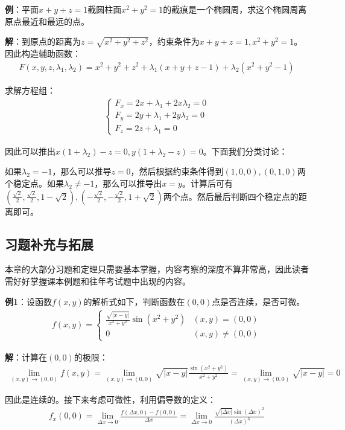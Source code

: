 \documentclass{ctexart}
\let\oldtextbf\textbf %
\renewcommand{\textbf}[1]{\textcolor{btex}{\oldtextbf{#1}}} %
\begin{document}
\textbf{例}：平面$x+y+z=1$截圆柱面$x^2+y^2=1$的截痕是一个椭圆周，求这个椭圆周离原点最近和最远的点。

\textbf{解}：到原点的距离为$z=\sqrt{x^2+y^2+z^2}$，约束条件为$x+y+z=1,x^2+y^2=1$。因此构造辅助函数：
\begin{align*}
    F(x,y,z,\lambda_1,\lambda_2)=x^2+y^2+z^2+\lambda_1(x+y+z-1)+\lambda_2(x^2+y^2-1)
\end{align*}

求解方程组：
\begin{align*}
    \begin{cases}
        F_x=2x+\lambda_1+2x\lambda_2=0\\
        F_y=2y+\lambda_1+2y\lambda_2=0\\
        F_z=2z+\lambda_1=0
    \end{cases}
\end{align*}

因此可以推出$x(1+\lambda_2)-z=0,y(1+\lambda_2-z)=0$。下面我们分类讨论：

如果$\lambda_2=-1$，那么可以推导$z=0$，然后根据约束条件得到$(1,0,0),(0,1,0)$两个稳定点。如果$\lambda_2\neq -1$，那么可以推导出$x=y$。计算后可有$(\frac{\sqrt{2}}{2},\frac{\sqrt{2}}{2},1-\sqrt{2}),(-\frac{\sqrt{2}}{2},-\frac{\sqrt{2}}{2},1+\sqrt{2})$两个点。然后最后判断四个稳定点的距离即可。

\subsection{习题补充与拓展}
本章的大部分习题和定理只需要基本掌握，内容考察的深度不算非常高，因此读者需好好掌握课本例题和往年考试题中出现的内容。

\textbf{例1}：设函数$f(x,y)$的解析式如下，判断函数在$(0,0)$点是否连续，是否可微。
\begin{align*}
    f(x,y)=\begin{cases}
        \frac{\sqrt{|x-y|}}{x^2+y^2}\sin(x^2+y^2) & (x,y)=(0,0)\\
        0 & (x,y)\neq (0,0)
    \end{cases}
\end{align*}

\textbf{解}：计算在$(0,0)$的极限：
\begin{align*}
    \lim_{(x,y)\to(0,0)}f(x,y)= \lim_{(x,y)\to(0,0)}\sqrt{|x-y|}\frac{\sin(x^2+y^2)}{x^2+y^2}
= \lim_{(x,y)\to(0,0)}\sqrt{|x-y|}=0
\end{align*}

因此是连续的。接下来考虑可微性，利用偏导数的定义：
\begin{align*}
f_x(0,0)=\lim_{\Delta x\to 0}\frac{f(\Delta x,0)-f(0,0)}{\Delta x}=\lim_{\Delta x\to 0}
\frac{\sqrt{|\Delta x|}\sin(\Delta x)^2}{(\Delta x)^3}  
\end{align*}
\end{document}
